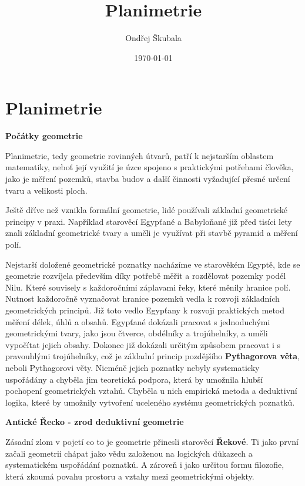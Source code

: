 \documentclass[12pt,a4paper]{article}
\title{Planimetrie}
\author{Ondřej Škubala}
\date{\today}
\begin{document}
\maketitle
\newpage

\section{Planimetrie}

\begin{historicalbox}

\textbf{Počátky geometrie}

\smallskip
Planimetrie, tedy geometrie rovinných útvarů, patří k nejstarším oblastem matematiky,
neboť její využití je úzce spojeno s praktickými potřebami člověka, jako je měření pozemků,
stavba budov a další činnosti vyžadující přesné určení tvaru a velikosti ploch.

Ještě dříve než vznikla formální geometrie, lidé používali základní geometrické principy
v praxi. Například starověcí Egypťané a Babyloňané již před tisíci lety znali
základní geometrické tvary a uměli je využívat při stavbě pyramid a měření polí.

Nejstarší doložené geometrické poznatky nacházíme ve starověkém Egyptě,
kde se geometrie rozvíjela především díky potřebě měřit a rozdělovat pozemky podél Nilu.
Které souvisely s každoročními záplavami řeky, které měnily hranice polí.
Nutnost každoročně vyznačovat hranice pozemků vedla k rozvoji základních geometrických principů.
Již toto vedlo Egypťany k rozvoji praktických metod měření délek, úhlů a obsahů.
Egypťané dokázali pracovat s jednoduchými geometrickými tvary, jako jsou čtverce,
obdélníky a trojúhelníky, a uměli vypočítat jejich obsahy. Dokonce již dokázali určitým způsobem
pracovat i s pravouhlými trojúhelníky, což je základní princip pozdějšího \textbf{Pythagorova věta}, neboli Pythagorovi věty.
Nicméně jejich poznatky nebyly systematicky uspořádány a chyběla jim teoretická podpora,
která by umožnila hlubší pochopení geometrických vztahů. Chyběla u nich empirická metoda a deduktivní logika,
které by umožnily vytvoření uceleného systému geometrických poznatků.

\bigskip
\textbf{Antické Řecko - zrod deduktivní geometrie}

\smallskip
Zásadní zlom v pojetí co to je geometrie přinesli starověcí \textbf{Řekové}.
Ti jako první začali geometrii chápat jako vědu založenou na logických důkazech a systematickém uspořádání poznatků.
A zároveň i jako určitou formu filozofie, která zkoumá povahu prostoru a vztahy mezi geometrickými objekty.


\end{historicalbox}
\end{document}
